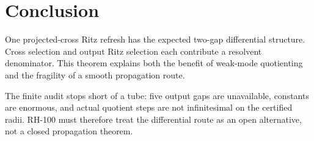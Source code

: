 \documentclass[11pt]{article}
\theoremstyle{definition}
\theoremstyle{remark}
\begin{document}
\section{Conclusion}

One projected-cross Ritz refresh has the expected two-gap differential
structure.  Cross selection and output Ritz selection each contribute a
resolvent denominator.  This theorem explains both the benefit of weak-mode
quotienting and the fragility of a smooth propagation route.

The finite audit stops short of a tube: five output gaps are unavailable,
constants are enormous, and actual quotient steps are not infinitesimal on
the certified radii.  RH-100 must therefore treat the differential route as
an open alternative, not a closed propagation theorem.



\end{document}
